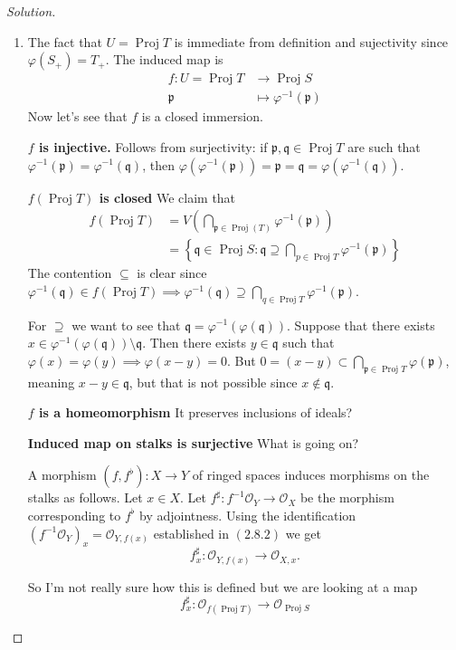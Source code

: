 \begin{proof}[Solution]\leavevmode
	\begin{enumerate}[label=\alph*.]
	\item The fact that $U=\operatorname{Proj}T$ is immediate from definition and sujectivity since  $\varphi(S_+)=T_+$.  The induced map is
		\begin{align*}
			f: U= \operatorname{Proj}T &\longrightarrow \operatorname{Proj}S \\
			\mathfrak{p} &\longmapsto \varphi^{-1}(\mathfrak{p})
		\end{align*}
	Now let's see that $f$ is a closed immersion. 

	\textbf{$f$ is injective.} Follows from surjectivity: if $\mathfrak{p},\mathfrak{q}\in\operatorname{Proj}T$ are such that $\varphi^{-1}(\mathfrak{p})=\varphi^{-1}(\mathfrak{q})$, then $\varphi(\varphi^{-1}(\mathfrak{p}))=\mathfrak{p}=\mathfrak{q}=\varphi(\varphi^{-1}(\mathfrak{q}))$.

	\textbf{$f(\operatorname{Proj}T)$ is closed} We claim that 
	\begin{align*}f(\operatorname{Proj}T)&=V\left(\bigcap_{\mathfrak{p}\in\operatorname{Proj}(T)}\varphi^{-1}(\mathfrak{p})\right)\\
		&=\left\{ \mathfrak{q}\in\operatorname{Proj}S:\mathfrak{q}\supseteq\bigcap_{p\in\operatorname{Proj}T} \varphi^{-1}(\mathfrak{p}) \right\} 
		\end{align*}
The contention $\subseteq$ is clear since  $\varphi^{-1}(\mathfrak{q})\in f(\operatorname{Proj}T)\implies \varphi^{-1}(\mathfrak{q})\supseteq\bigcap_{q\in\operatorname{Proj}T} \varphi^{-1}(\mathfrak{p})$.

For $\supseteq$ we want to see that $\mathfrak{q}=\varphi^{-1}(\varphi(\mathfrak{q}))$. Suppose that there exists $x\in\varphi^{-1}(\varphi(\mathfrak{q}))\setminus \mathfrak{q}$. Then there exists $y\in\mathfrak{q}$ such that  $\varphi (x)=\varphi (y)\implies \varphi (x-y)=0$. But $0=(x-y)\subset \bigcap_{\mathfrak{p}\in\operatorname{Proj}T} \varphi(\mathfrak{p})$, meaning $x-y\in\mathfrak{q}$, but that is not possible since $ x\not\in\mathfrak{q}$.

	\textbf{$f$ is a homeomorphism} It preserves inclusions of ideals?

\textbf{Induced map on stalks is surjective} What is going on?

\begin{remark}[Gortz, p. 57]
A morphism $(f,f ^\flat):X\to Y$ of ringed spaces induces morphisms on the stalks as follows. Let $x\in X$. Let $f^\sharp:f^{-1}\mathcal{O}_Y\to  \mathcal{O}_X$ be the morphism corresponding to $f ^\flat$ by adjointness. Using the identification $(f^{-1}\mathcal{O}_Y)_x=\mathcal{O}_{Y,f(x)}$ established in $(2.8.2)$ we get
\[f^\sharp _x:\mathcal{O}_{Y,f(x)}\longrightarrow \mathcal{O}_{X,x}.\]
\end{remark}
So I'm not really sure how this is defined but we are looking at a map
\[f^\sharp _x:\mathcal{O}_{f(\operatorname{Proj}T)}\longrightarrow \mathcal{O}_{\operatorname{Proj}S}\]


\end{enumerate}
\end{proof}

